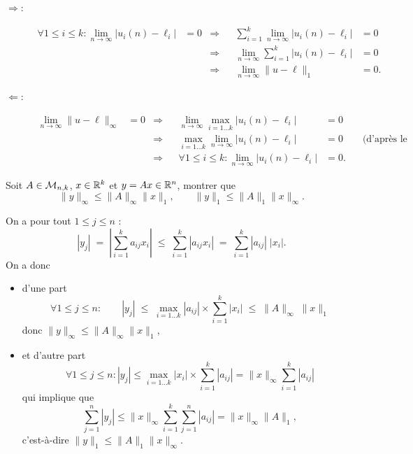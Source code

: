 \begin{description}
  \item[$\Rightarrow$:]
    \begin{align*}
      \forall 1 \leq i \leq k: \lim_{n \to \infty} |u_i(n) - \ell_i| & = 0 
      & \Rightarrow & & \sum_{i=1}^k \lim_{n \to \infty} |u_i(n) - \ell_i| & = 0 \\
      & & \Rightarrow & & \lim_{n \to \infty} \sum_{i=1}^k |u_i(n) - \ell_i| & = 0 \\
      & & \Rightarrow & &  \lim_{n \to \infty} \|u - \ell\|_1 & = 0. 
    \end{align*}
  \item[$\Leftarrow$:]
  \begin{align*}
    \lim_{n \to \infty} \|u - \ell\|_\infty & = 0
    & \Rightarrow & & \lim_{n \to \infty} \max_{i=1 \dots k} |u_i(n) - \ell_i| & = 0 \\
    & & \Rightarrow & & \max_{i=1 \dots k} \lim_{n \to \infty} |u_i(n) - \ell_i| & = 0 \qquad \text{(d'après le lemme)}\\
    & & \Rightarrow & & \forall 1 \leq i \leq k: \lim_{n \to \infty} |u_i(n) - \ell_i| & = 0.
  \end{align*}
\end{description} 
\eproof

\begin{proposition} \label{prop:normeProduitMatriceVecteur}
  Soit $A \in \mathcal{M}_{n, k}$, $x \in \mathbb{R}^k$ et $y = Ax \in \mathbb{R}^n$, montrer que 
  $$
  \|y\|_\infty \leq \|A\|_\infty \|x\|_1, \qquad
  \|y\|_1 \leq \|A\|_1 \|x\|_\infty.
  $$
\end{proposition}

\proof On a pour tout $1 \leq j \leq n$ :
$$
|y_j| 
\; = \; \left|\sum_{i=1}^k a_{ij} x_i \right| 
\; \leq \; \sum_{i=1}^k |a_{ij} x_i| 
\; = \; \sum_{i=1}^k |a_{ij}| \; |x_i|.
$$
On a donc
\begin{itemize}
  \item d'une part
  $$
  \forall 1 \leq j \leq n: \qquad |y_j| 
  \; \leq \; \max_{i=1 \dots k} |a_{ij}| \times \sum_{i=1}^k |x_i| 
  \; \leq \; \|A\|_\infty \; \|x\|_1
  $$
  donc $\|y\|_\infty \leq \|A\|_\infty \|x\|_1$,
  \item et d'autre part
  $$
  \forall 1 \leq j \leq n: |y_j| 
  \leq \max_{i=1 \dots k} |x_i| \times \sum_{i=1}^k |a_{ij}| = \|x\|_\infty \sum_{i=1}^k |a_{ij}| 
  $$
  qui implique que
  $$
  \sum_{j=1}^n |y_j| 
  \leq \|x\|_\infty \sum_{i=1}^k \sum_{j=1}^n |a_{ij}| = \|x\|_\infty \|A\|_1,
  $$
  c'est-à-dire $\|y\|_1 \leq \|A\|_1 \|x\|_\infty$.
\end{itemize}
\eproof


